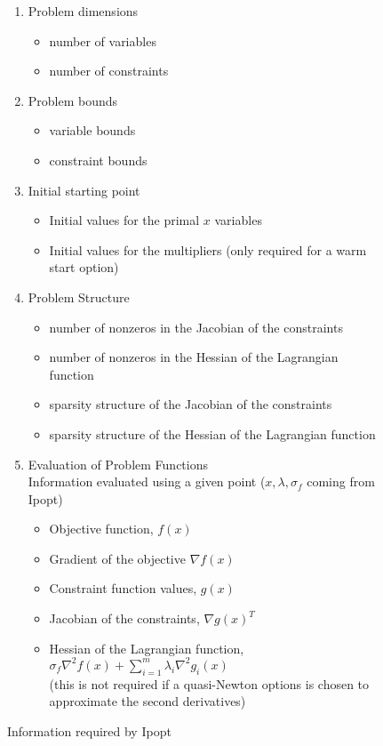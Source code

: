 \documentclass[10pt]{article}
\newcommand{\Ipopt}{{\sc Ipopt}}
\begin{document}
\begin{figure}
\begin{enumerate}
\item Problem dimensions \label{it.prob_dim}
  \begin{itemize}
  \item number of variables
  \item number of constraints
  \end{itemize}
\item Problem bounds
  \begin{itemize}
  \item variable bounds
  \item constraint bounds
  \end{itemize}
\item Initial starting point
  \begin{itemize}
  \item Initial values for the primal $x$ variables
  \item Initial values for the multipliers (only
    required for a warm start option)
  \end{itemize}
\item Problem Structure \label{it.prob_struct}
  \begin{itemize}
  \item number of nonzeros in the Jacobian of the constraints
  \item number of nonzeros in the Hessian of the Lagrangian function
  \item sparsity structure of the Jacobian of the constraints
  \item sparsity structure of the Hessian of the Lagrangian function
  \end{itemize}
\item Evaluation of Problem Functions \label{it.prob_eval} \\
  Information evaluated using a given point ($x,
  \lambda, \sigma_f$ coming from \Ipopt)
  \begin{itemize}
  \item Objective function, $f(x)$
  \item Gradient of the objective $\nabla f(x)$
  \item Constraint function values, $g(x)$
  \item Jacobian of the constraints, $\nabla g(x)^T$
  \item Hessian of the Lagrangian function, 
    $\sigma_f \nabla^2 f(x) + \sum_{i=1}^m\lambda_i\nabla^2
    g_i(x)$ \\
    (this is not required if a quasi-Newton options is chosen to
    approximate the second derivatives)
  \end{itemize}
\end{enumerate}
\caption{Information required by \Ipopt}
\label{fig.required_info}
\end{figure}
\end{document}
